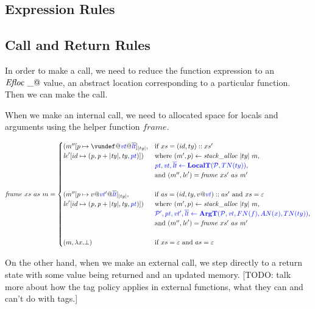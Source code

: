 \documentclass{llncs}
\begin{document}
\subsection{Expression Rules}

\expressions

\subsection{Call and Return Rules}

In order to make a call, we need to reduce the function expression to an \(\mathit{Efloc} ~ \_@\) value, an
abstract location corresponding to a particular function. Then we can make the call.

\callexprstep

When we make an internal call, we need to allocated space for locals and arguments using the helper function
\(\mathit{frame}\).

\[\mathit{frame} ~ xs ~ as ~ \mem =
\begin{cases}
  (\mem''[p \mapsto \vundef@\vt@\overline{\lt}]_{|ty|}, & \textnormal{if } xs = (id,ty)::xs' \\
  \lenv'[id \mapsto (\mathit{p, p+|ty|,ty,\pt})]) &
  \textnormal{where } (\mem',p) \leftarrow \mathit{stack\_alloc} ~ |ty| ~ \mem, \\
  & \trule{\localtres}{\localt}, \\
  & \textnormal{and } (\mem'',\lenv') = \mathit{frame} ~ xs' ~ as ~ m' \\ 
  \\
  (\mem''[p \mapsto v@\vt'@\overline{\lt}]_{|ty|}, & \textnormal{if } as = (id,ty,v @ \vt)::as' \textnormal{ and } xs = \varepsilon \\
  \lenv'[id \mapsto (\mathit{p, p+|ty|,ty,\pt})]) &
  \textnormal{where } (\mem',p) \leftarrow \mathit{stack\_alloc} ~ |ty| ~ \mem, \\
  & \trule{\argtres}{\argt}, \\
  & \textnormal{and } (\mem'',\lenv') = \mathit{frame} ~ xs' ~ as ~ m' \\
  \\
  (\mem, \lambda x . \bot) & \textnormal{if } xs = \varepsilon \textnormal{ and } as = \varepsilon \\
\end{cases}\]

\callstep

On the other hand, when we make an external call, we step directly to a return state with some value
being returned and an updated memory. [TODO: talk more about how the tag policy applies in external
  functions, what they can and can't do with tags.]
\end{document}
